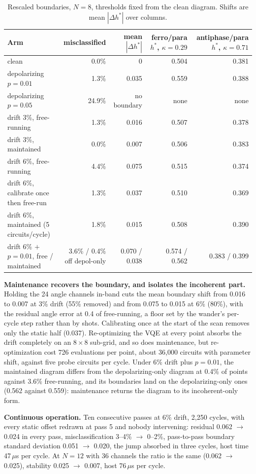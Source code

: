 \documentclass[10pt,letterpaper]{article}
\begin{document}
\begin{table}[h]\caption{Rescaled boundaries, $N=8$, thresholds fixed from the clean diagram. Shifts are mean $|{\Delta h^*}|$ over columns.}
\small\begin{tabularx}{\textwidth}{Y r r r r}\toprule
Arm & misclassified & mean $|\Delta h^*|$ & ferro/para $h^*$, $\kappa{=}0.29$ & antiphase/para $h^*$, $\kappa{=}0.71$\\\midrule
clean & 0.0\% & 0 & 0.504 & 0.381\\
depolarizing $p=0.01$ & 1.3\% & 0.035 & 0.559 & 0.388\\
depolarizing $p=0.05$ & 24.9\% & no boundary & none & none\\
drift 3\%, free-running & 1.3\% & 0.016 & 0.507 & 0.378\\
drift 3\%, maintained & 0.0\% & 0.007 & 0.506 & 0.383\\
drift 6\%, free-running & 4.4\% & 0.075 & 0.515 & 0.374\\
drift 6\%, calibrate once then free-run & 1.3\% & 0.037 & 0.510 & 0.369\\
drift 6\%, maintained (5 circuits/cycle) & 1.8\% & 0.015 & 0.508 & 0.390\\
drift 6\% $+$ $p=0.01$, free / maintained & 3.6\% / 0.4\% off depol-only & 0.070 / 0.038 & 0.574 / 0.562 & 0.383 / 0.399\\
\bottomrule\end{tabularx}\end{table}

\textbf{Maintenance recovers the boundary, and isolates the incoherent part.} Holding the 24 angle channels in-band cuts the mean boundary shift from 0.016 to 0.007 at 3\% drift (55\% removed) and from 0.075 to 0.015 at 6\% (80\%), with the residual angle error at 0.4 of free-running, a floor set by the wander's per-cycle step rather than by shots. Calibrating once at the start of the scan removes only the static half (0.037). Re-optimizing the VQE at every point absorbs the drift completely on an $8\times8$ sub-grid, and so does maintenance, but re-optimization cost 726 evaluations per point, about 36,000 circuits with parameter shift, against five probe circuits per cycle. Under 6\% drift plus $p=0.01$, the maintained diagram differs from the depolarizing-only diagram at 0.4\% of points against 3.6\% free-running, and its boundaries land on the depolarizing-only ones (0.562 against 0.559): maintenance returns the diagram to its incoherent-only form.

\textbf{Continuous operation.} Ten consecutive passes at 6\% drift, 2,250 cycles, with every static offset redrawn at pass 5 and nobody intervening: residual 0.062 $\to$ 0.024 in every pass, misclassification 3--4\% $\to$ 0--2\%, pass-to-pass boundary standard deviation 0.051 $\to$ 0.020, the jump absorbed in three cycles, host time 47\,$\mu$s per cycle. At $N=12$ with 36 channels the ratio is the same (0.062 $\to$ 0.025), stability 0.025 $\to$ 0.007, host 76\,$\mu$s per cycle.
\end{document}
